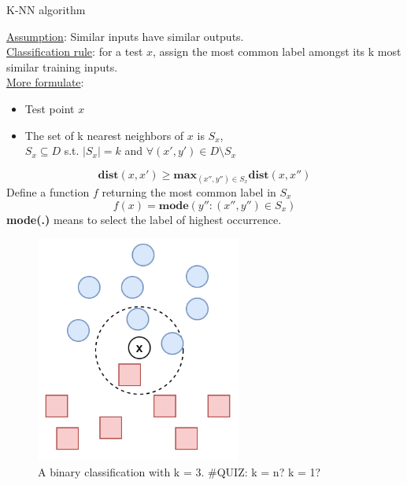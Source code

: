 \documentclass[aspectratio=1610]{beamer}
\begin{document}
\begin{frame}{K-NN algorithm}
\begin{minipage}{0.6\textwidth}
\underline{Assumption}: Similar inputs have similar outputs.\\
\underline{Classification rule}: for a test $x$, assign the most common label amongst its k most similar training inputs.\\
\underline{More formulate}:
\begin{itemize}
    \item Test point $x$
    \item The set of k nearest neighbors of $x$ is $S_x$, \\$S_x\subseteq D$ s.t. $|S_x| = k$ and $\forall (x',y') \in D\setminus S_x$
    
\end{itemize}
 $$\textbf{dist}(x,x') \geq \mathbf{max}_{(x'',y'')\in S_x} \textbf{dist}(x,x'')$$
Define a function $f$ returning the most common label in $S_x$
$$f(x) = \textbf{mode}({y'':(x'',y'') \in S_x})$$
\textbf{mode(.)} means to select the label of highest occurrence.
  
\end{minipage}
\begin{minipage}{0.3\textwidth}

    \begin{figure}[h!]
  \includegraphics[width=0.6\textwidth]{Screen Shot 2022-05-21 at 14.44.10.png}
  \caption{A binary classification with k = 3. #QUIZ: k = n? k = 1?}
\end{figure}
\end{minipage}
\end{frame}
\end{document}
